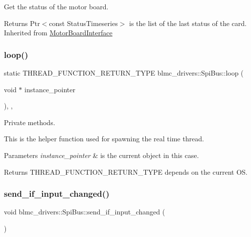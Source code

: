 Get the status of the motor board. 

\begin{DoxyReturn}{Returns}
Ptr$<$const Status\+Timeseries$>$ is the list of the last status of the card. Inherited from \hyperlink{classblmc__drivers_1_1MotorBoardInterface}{Motor\+Board\+Interface} 
\end{DoxyReturn}
\mbox{\label{classblmc__drivers_1_1SpiBus_a1838b3861afd142bb5db570841baada1}} 
\subsubsection{\texorpdfstring{loop()}{loop()}}
{\footnotesize\ttfamily static T\+H\+R\+E\+A\+D\+\_\+\+F\+U\+N\+C\+T\+I\+O\+N\+\_\+\+R\+E\+T\+U\+R\+N\+\_\+\+T\+Y\+PE blmc\+\_\+drivers\+::\+Spi\+Bus\+::loop (\begin{DoxyParamCaption}\item[{void $\ast$}]{instance\+\_\+pointer }\end{DoxyParamCaption})\hspace{0.3cm}{\ttfamily [inline]}, {\ttfamily [static]}, {\ttfamily [private]}}



Private methods. 

This is the helper function used for spawning the real time thread.


\begin{DoxyParams}{Parameters}
{\em instance\+\_\+pointer} & is the current object in this case. \\
\hline
\end{DoxyParams}
\begin{DoxyReturn}{Returns}
T\+H\+R\+E\+A\+D\+\_\+\+F\+U\+N\+C\+T\+I\+O\+N\+\_\+\+R\+E\+T\+U\+R\+N\+\_\+\+T\+Y\+PE depends on the current OS. 
\end{DoxyReturn}
\mbox{\label{classblmc__drivers_1_1SpiBus_ab3802bb10a387b14c7cedc9175823421}} 
\subsubsection{\texorpdfstring{send\+\_\+if\+\_\+input\+\_\+changed()}{send\_if\_input\_changed()}}
{\footnotesize\ttfamily void blmc\+\_\+drivers\+::\+Spi\+Bus\+::send\+\_\+if\+\_\+input\+\_\+changed (\begin{DoxyParamCaption}{ }\end{DoxyParamCaption})\hspace{0.3cm}{\ttfamily [virtual]}}



